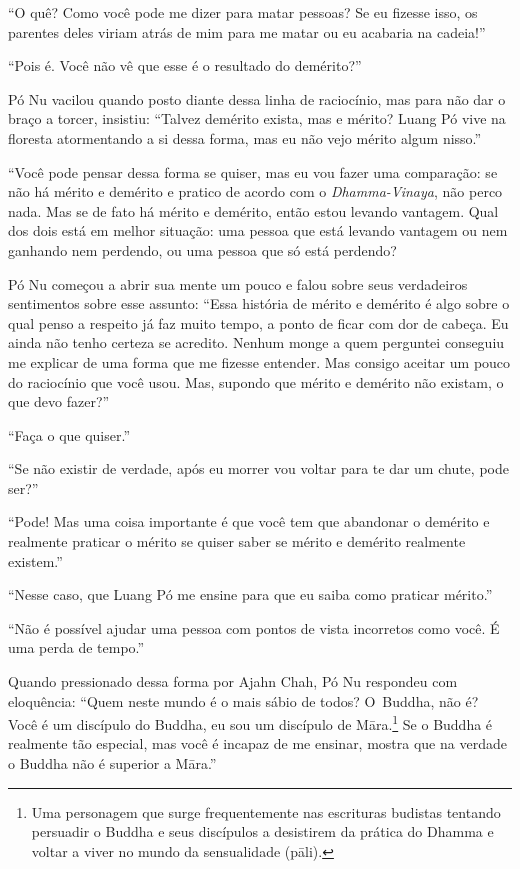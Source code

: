 ``O quê? Como você pode me dizer para matar pessoas? Se eu fizesse isso,
os parentes deles viriam atrás de mim para me matar ou eu acabaria na
cadeia!''

``Pois é. Você não vê que esse é o resultado do demérito?''

Pó Nu vacilou quando posto diante dessa linha de raciocínio, mas para
não dar o braço a torcer, insistiu: ``Talvez demérito exista, mas e
mérito? Luang Pó vive na floresta atormentando a si dessa forma, mas eu
não vejo mérito algum nisso.''

``Você pode pensar dessa forma se quiser, mas eu vou fazer uma
comparação: se não há mérito e demérito e pratico de acordo com o
\emph{Dhamma-Vinaya}, não perco nada. Mas se de fato há mérito e
demérito, então estou levando vantagem. Qual dos dois está em melhor
situação: uma pessoa que está levando vantagem ou nem ganhando nem
perdendo, ou uma pessoa que só está perdendo?

Pó Nu começou a abrir sua mente um pouco e falou sobre seus verdadeiros
sentimentos sobre esse assunto: ``Essa história de mérito e demérito é
algo sobre o qual penso a respeito já faz muito tempo, a ponto de ficar
com dor de cabeça. Eu ainda não tenho certeza se acredito. Nenhum monge
a quem perguntei conseguiu me explicar de uma forma que me fizesse
entender. Mas consigo aceitar um pouco do raciocínio que você usou. Mas,
supondo que mérito e demérito não existam, o que devo fazer?''

``Faça o que quiser.''

``Se não existir de verdade, após eu morrer vou voltar para te dar um
chute, pode ser?''

``Pode! Mas uma coisa importante é que você tem que abandonar o demérito
e realmente praticar o mérito se quiser saber se mérito e demérito
realmente existem.''

``Nesse caso, que Luang Pó me ensine para que eu saiba como praticar
mérito.''

``Não é possível ajudar uma pessoa com pontos de vista incorretos como
você. É uma perda de tempo.''

Quando pressionado dessa forma por Ajahn Chah, Pó Nu respondeu com
eloquência: ``Quem neste mundo é o mais sábio de todos? O~Buddha, não é?
Você é um discípulo do Buddha, eu sou um discípulo de Māra.\footnote{Uma
  personagem que surge frequentemente nas escrituras budistas tentando
  persuadir o Buddha e seus discípulos a desistirem da prática do Dhamma
  e voltar a viver no mundo da sensualidade (pāli).} Se o Buddha é
realmente tão especial, mas você é incapaz de me ensinar, mostra que na
verdade o Buddha não é superior a Māra.''

